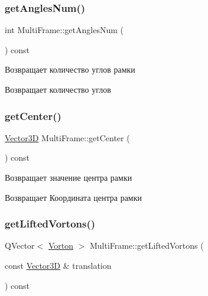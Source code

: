 \subsubsection{\texorpdfstring{get\+Angles\+Num()}{getAnglesNum()}}
{\footnotesize\ttfamily int Multi\+Frame\+::get\+Angles\+Num (\begin{DoxyParamCaption}{ }\end{DoxyParamCaption}) const\hspace{0.3cm}{\ttfamily [virtual]}}

Возвращает количество углов рамки \begin{DoxyReturn}{Возвращает}
количество углов 
\end{DoxyReturn}
\mbox{\label{class_multi_frame_a60bcd87f0a269b421ad4539325898bd7}} 
\subsubsection{\texorpdfstring{get\+Center()}{getCenter()}}
{\footnotesize\ttfamily \mbox{\hyperlink{class_vector3_d}{Vector3D}} Multi\+Frame\+::get\+Center (\begin{DoxyParamCaption}{ }\end{DoxyParamCaption}) const\hspace{0.3cm}{\ttfamily [virtual]}}

Возвращает значение центра рамки \begin{DoxyReturn}{Возвращает}
Координата центра рамки 
\end{DoxyReturn}
\mbox{\label{class_multi_frame_a676285039ba30dd258b04104b2139f90}} 
\subsubsection{\texorpdfstring{get\+Lifted\+Vortons()}{getLiftedVortons()}}
{\footnotesize\ttfamily Q\+Vector$<$ \mbox{\hyperlink{class_vorton}{Vorton}} $>$ Multi\+Frame\+::get\+Lifted\+Vortons (\begin{DoxyParamCaption}\item[{const \mbox{\hyperlink{class_vector3_d}{Vector3D}} \&}]{translation }\end{DoxyParamCaption}) const\hspace{0.3cm}{\ttfamily [virtual]}}

